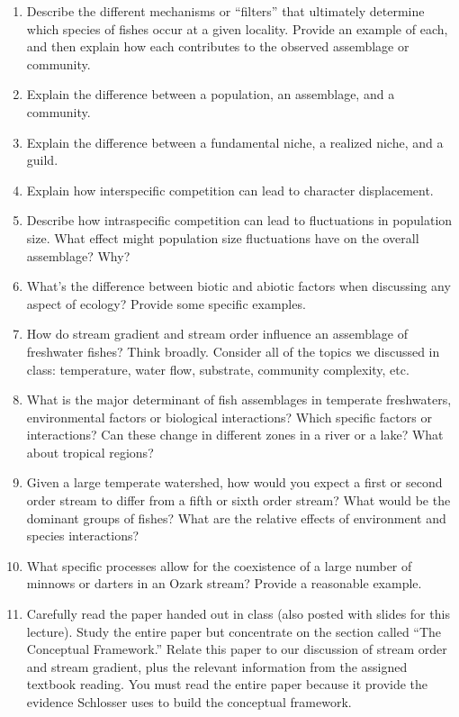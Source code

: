 \documentclass[letterpaper]{tufte-handout}
\begin{document}
\begin{enumerate}
	\item Describe the different mechanisms or “filters” that ultimately determine which species of fishes occur at a given locality.  Provide an example of each, and then explain how each contributes to the observed assemblage or community.

	\item Explain the difference between a population, an assemblage, and a community.

	\item Explain the difference between a fundamental niche, a realized niche, and a guild.   

	\item Explain how interspecific competition can lead to character displacement.

	\item Describe how intraspecific competition can lead to fluctuations in population size.  What effect might population size fluctuations have on the overall assemblage?  Why?
	
	\item What’s the difference between biotic and abiotic factors when discussing any aspect of ecology?  Provide some specific examples.
	
	\item How do stream gradient and stream order influence an assemblage of freshwater fishes?  Think broadly.  Consider all of the topics we discussed in class: temperature, water flow, substrate, community complexity, etc.
	
	\item What is the major determinant of fish assemblages in temperate freshwaters, environmental factors or biological interactions?  Which specific factors or interactions?  Can these change in different zones in a river or a lake?  What about tropical regions?
	
	\item Given a large temperate watershed, how would you expect a first or second order stream to differ from a fifth or sixth order stream?  What would be the dominant groups of fishes?  What are the relative effects of environment and species interactions?
	
	\item What specific processes allow for the coexistence of a large number of minnows or darters in an Ozark stream? Provide a reasonable example.
		
	\item Carefully read the paper handed out in class (also posted with slides for this lecture). Study the entire paper but concentrate on the section called “The Conceptual Framework.” Relate this paper to our discussion of stream order and stream gradient, plus the relevant information from the assigned textbook reading. You must read the entire paper because it provide the evidence Schlosser uses to build the conceptual framework.
%
\end{enumerate}
\end{document}
